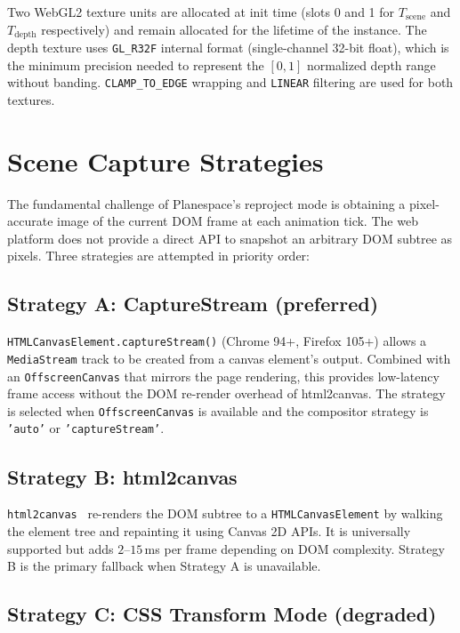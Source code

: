 \documentclass[10pt,twocolumn]{article}
\newcommand{\Tscene}{T_{\mathrm{scene}}}
\newcommand{\Tdepth}{T_{\mathrm{depth}}}
\begin{document}
Two WebGL2 texture units are allocated at init time (slots 0 and 1 for
$\Tscene$ and $\Tdepth$ respectively) and remain allocated for the lifetime
of the instance. The depth texture uses \texttt{GL\_R32F} internal format
(single-channel 32-bit float), which is the minimum precision needed to
represent the $[0, 1]$ normalized depth range without banding.
\texttt{CLAMP\_TO\_EDGE} wrapping and \texttt{LINEAR} filtering are used
for both textures.

\section{Scene Capture Strategies}
\label{sec:capture}

The fundamental challenge of Planespace's reproject mode is obtaining a
pixel-accurate image of the current DOM frame at each animation tick.
The web platform does not provide a direct API to snapshot an arbitrary
DOM subtree as pixels. Three strategies are attempted in priority order:

\subsection{Strategy A: CaptureStream (preferred)}

\texttt{HTMLCanvasElement.captureStream()} (Chrome 94+, Firefox 105+) allows
a \texttt{MediaStream} track to be created from a canvas element's output.
Combined with an \texttt{OffscreenCanvas} that mirrors the page rendering,
this provides low-latency frame access without the DOM re-render overhead of
html2canvas. The strategy is selected when \texttt{OffscreenCanvas} is
available and the compositor strategy is \texttt{'auto'} or
\texttt{'captureStream'}.

\subsection{Strategy B: html2canvas}

\texttt{html2canvas}~\cite{niklasvh2024} re-renders the DOM subtree to a
\texttt{HTMLCanvasElement} by walking the element tree and repainting it
using Canvas 2D APIs. It is universally supported but adds $2$--$15$\,ms
per frame depending on DOM complexity. Strategy B is the primary fallback
when Strategy A is unavailable.

\subsection{Strategy C: CSS Transform Mode (degraded)}
\end{document}
